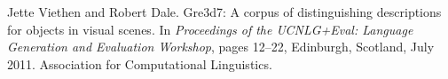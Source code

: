 \documentclass[a4paper,12pt]{article}
\begin{document}
\begin{thebibliography}{10}
Jette Viethen and Robert Dale.
\newblock Gre3d7: A corpus of distinguishing descriptions for objects in visual
  scenes.
\newblock In {\em Proceedings of the UCNLG+Eval: Language Generation and
  Evaluation Workshop}, pages 12--22, Edinburgh, Scotland, July 2011.
  Association for Computational Linguistics.

\end{thebibliography}



\end{document}
